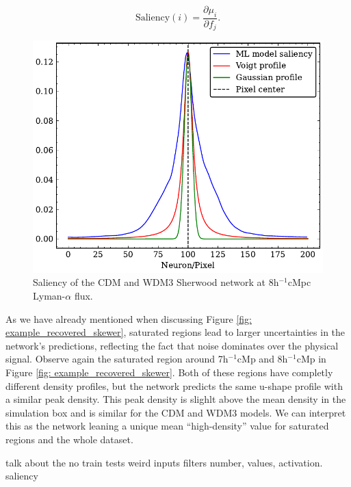 \begin{equation}
    \text{Saliency}(i) = \frac{\partial  \mu_i}{\partial f_j}.
\end{equation}




\begin{figure}
    \centering
    \includegraphics[width=0.6\linewidth]{img/ML/saliency.pdf}
    \caption{Saliency of the CDM and WDM3 Sherwood network at 8h$^{-1}$cMpc Lyman-$\alpha$ flux.}
    \label{fig: saliency}
\end{figure}



As we have already mentioned when discussing Figure \ref{fig: example_recovered_skewer}, saturated regions lead to larger uncertainties in the network's predictions, reflecting the fact that noise dominates over the physical signal. Observe again the saturated region around 7h$^{-1}$cMp and 8h$^{-1}$cMp in Figure \ref{fig: example_recovered_skewer}. Both of these regions have completly different density profiles, but the network predicts the same u-shape profile with a similar peak density. This peak density is slighlt above the mean density in the simulation box and is similar for the CDM and WDM3 models. We can interpret this as the network leaning a unique mean ``high-density'' value for saturated regions and the whole dataset.



talk about the no train tests
weird inputs
filters number, values, activation.
saliency






